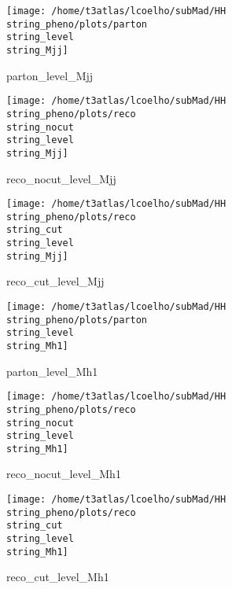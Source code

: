 \documentclass[a4paper,onecolumn,final,11pt]{article}
\begin{document}
\begin{figure}[H] 
\centering 
\begin{minipage}{.32\textwidth} 
        \centering 
        \hspace{0cm} 
        \texttt{[image: /home/t3atlas/lcoelho/subMad/HH\\string\_pheno/plots/parton\\string\_level\\string\_Mjj]} 
        \caption{parton_level_Mjj} 
\end{minipage} 
\hfill 
\begin{minipage}{.32\textwidth} 
        \centering 
        \hspace{0cm} 
    \texttt{[image: /home/t3atlas/lcoelho/subMad/HH\\string\_pheno/plots/reco\\string\_nocut\\string\_level\\string\_Mjj]} 
        \caption{reco_nocut_level_Mjj} 
\end{minipage} 
\hfill 
\begin{minipage}{.32\textwidth} 
        \centering 
        \hspace{0cm} 
    \texttt{[image: /home/t3atlas/lcoelho/subMad/HH\\string\_pheno/plots/reco\\string\_cut\\string\_level\\string\_Mjj]} 
        \caption{reco_cut_level_Mjj} 
\end{minipage} 
\end{figure} 
 
\begin{figure}[H] 
\centering 
\begin{minipage}{.32\textwidth} 
        \centering 
        \hspace{0cm} 
        \texttt{[image: /home/t3atlas/lcoelho/subMad/HH\\string\_pheno/plots/parton\\string\_level\\string\_Mh1]} 
        \caption{parton_level_Mh1} 
\end{minipage} 
\hfill 
\begin{minipage}{.32\textwidth} 
        \centering 
        \hspace{0cm} 
    \texttt{[image: /home/t3atlas/lcoelho/subMad/HH\\string\_pheno/plots/reco\\string\_nocut\\string\_level\\string\_Mh1]} 
        \caption{reco_nocut_level_Mh1} 
\end{minipage} 
\hfill 
\begin{minipage}{.32\textwidth} 
        \centering 
        \hspace{0cm} 
    \texttt{[image: /home/t3atlas/lcoelho/subMad/HH\\string\_pheno/plots/reco\\string\_cut\\string\_level\\string\_Mh1]} 
        \caption{reco_cut_level_Mh1} 
\end{minipage} 
\end{figure} 
 
\end{document}
